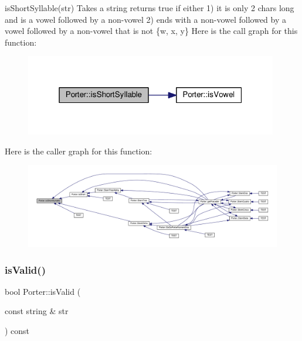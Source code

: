 is\+Short\+Syllable(str) Takes a string returns true if either 1) it is only 2 chars long and is a vowel followed by a non-\/vowel 2) ends with a non-\/vowel followed by a vowel followed by a non-\/vowel that is not \{\textquotesingle{}w\textquotesingle{}, \textquotesingle{}x\textquotesingle{}, \textquotesingle{}y\textquotesingle{}\} Here is the call graph for this function\+:
\nopagebreak
\begin{figure}[H]
\begin{center}
\leavevmode
\includegraphics[width=313pt]{class_porter_a36e6678f68a4cc29371cc0111a8c8860_cgraph}
\end{center}
\end{figure}
Here is the caller graph for this function\+:
\nopagebreak
\begin{figure}[H]
\begin{center}
\leavevmode
\includegraphics[width=350pt]{class_porter_a36e6678f68a4cc29371cc0111a8c8860_icgraph}
\end{center}
\end{figure}
\mbox{\label{class_porter_a9da79dd6524131e703619d3e301e896a}} 
\subsubsection{\texorpdfstring{is\+Valid()}{isValid()}}
{\footnotesize\ttfamily bool Porter\+::is\+Valid (\begin{DoxyParamCaption}\item[{const string \&}]{str }\end{DoxyParamCaption}) const}

